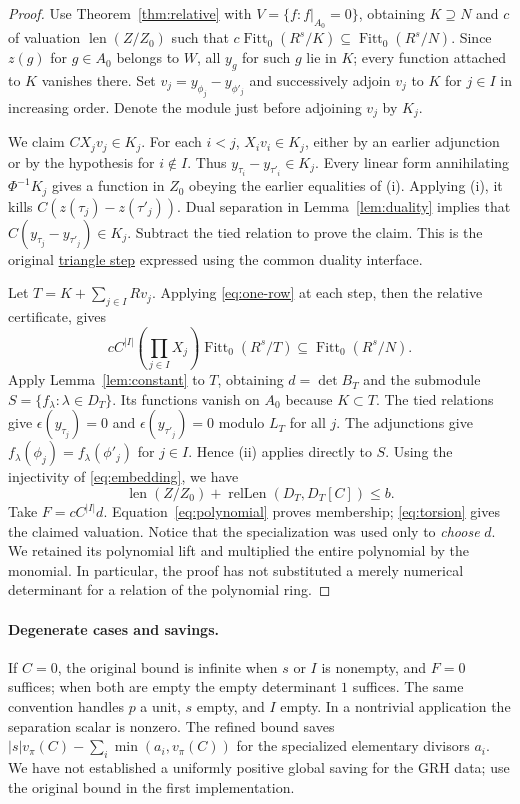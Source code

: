 \documentclass[11pt]{article}
\newcommand{\Fitt}{\operatorname{Fitt}_0}
\newcommand{\len}{\operatorname{len}}
\newcommand{\rl}{\operatorname{relLen}}
\newcommand{\val}{v_\pi}
\newcommand{\src}[3]{\href{https://github.com/VladimirReshetnikov/ProveIt/blob/835c3695d07c0f77060c5cc63f92eeb52a7d21c2/Analysis/GeneralizedRiemannHypothesis/Lean/grh/src/#1.lean\#L#2}{#3}}
\newcommand{\fb}[2]{\src{New/Congruences/FirstOrder/FittingBlock}{#1}{#2}}
\begin{document}
\begin{proof}
Use Theorem~\ref{thm:relative} with $V=\{f:f|_{A_0}=0\}$, obtaining $K\supseteq N$ and $c$ of valuation $\len(Z/Z_0)$ such that $c\Fitt(R^s/K)\subseteq\Fitt(R^s/N)$. Since $z(g)$ for $g\in A_0$ belongs to $W$, all $y_g$ for such $g$ lie in $K$; every function attached to $K$ vanishes there. Set $v_j=y_{\phi_j}-y_{\phi'_j}$ and successively adjoin $v_j$ to $K$ for $j\in I$ in increasing order. Denote the module just before adjoining $v_j$ by $K_j$.

We claim $CX_jv_j\in K_j$. For each $i<j$, $X_iv_i\in K_j$, either by an earlier adjunction or by the hypothesis for $i\notin I$. Thus $y_{\tau_i}-y_{\tau'_i}\in K_j$. Every linear form annihilating $\Phi^{-1}K_j$ gives a function in $Z_0$ obeying the earlier equalities of (i). Applying (i), it kills $C(z(\tau_j)-z(\tau'_j))$. Dual separation in Lemma~\ref{lem:duality} implies that $C(y_{\tau_j}-y_{\tau'_j})\in K_j$. Subtract the tied relation to prove the claim. This is the original \fb{107}{triangle step} expressed using the common duality interface.

Let $T=K+\sum_{j\in I}Rv_j$. Applying \eqref{eq:one-row} at each step, then the relative certificate, gives
\begin{equation}\label{eq:polynomial}
  c C^{|I|}\left(\prod_{j\in I}X_j\right)\Fitt(R^s/T)
     \subseteq\Fitt(R^s/N).
\end{equation}
Apply Lemma~\ref{lem:constant} to $T$, obtaining $d=\det B_T$ and the submodule $S=\{f_\lambda:\lambda\in D_T\}$. Its functions vanish on $A_0$ because $K\subset T$. The tied relations give $\epsilon(y_{\tau_j})=0$ and $\epsilon(y_{\tau'_j})=0$ modulo $L_T$ for all $j$. The adjunctions give $f_\lambda(\phi_j)=f_\lambda(\phi'_j)$ for $j\in I$. Hence (ii) applies directly to $S$. Using the injectivity of \eqref{eq:embedding}, we have
\[
 \len(Z/Z_0)+\rl(D_T,D_T[C])\le b.
\]
Take $F=c C^{|I|}d$. Equation~\eqref{eq:polynomial} proves membership; \eqref{eq:torsion} gives the claimed valuation. Notice that the specialization was used only to \emph{choose} $d$. We retained its polynomial lift and multiplied the entire polynomial by the monomial. In particular, the proof has not substituted a merely numerical determinant for a relation of the polynomial ring.
\end{proof}

\paragraph{Degenerate cases and savings.} If $C=0$, the original bound is infinite when $s$ or $I$ is nonempty, and $F=0$ suffices; when both are empty the empty determinant $1$ suffices. The same convention handles $p$ a unit, $s$ empty, and $I$ empty. In a nontrivial application the separation scalar is nonzero. The refined bound saves $|s|\val(C)-\sum_i\min(a_i,\val(C))$ for the specialized elementary divisors $a_i$. We have not established a uniformly positive global saving for the GRH data; use the original bound in the first implementation.
\end{document}
